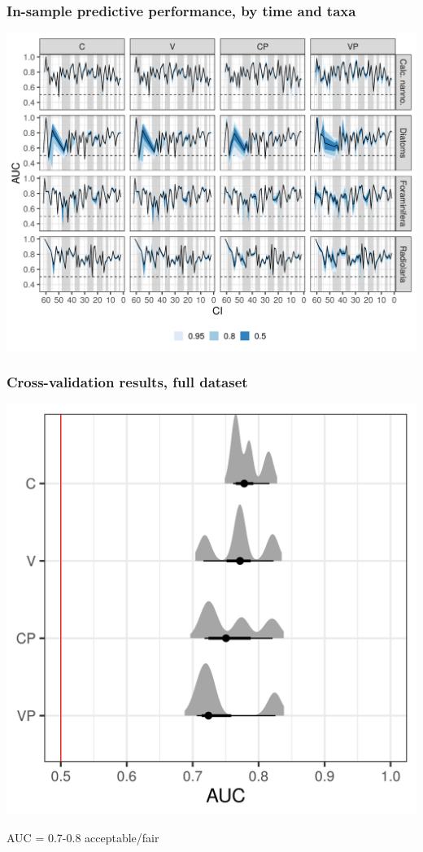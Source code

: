 \documentclass[aspectratio=169]{beamer}
\begin{document}
\begin{frame}
  \frametitle{In-sample predictive performance, by time and taxa}

  \begin{center}
    \includegraphics[width=\textwidth,height=0.8\textheight,keepaspectratio=true]{../results/figure/auc_taxon_time_full}
  \end{center}

\end{frame}

\begin{frame}
  \frametitle{Cross-validation results, full dataset}

  \begin{center}
    \includegraphics[width=\textwidth,height=0.8\textheight,keepaspectratio=true]{../results/figure/fold_auc_zoom_full}

    \footnotesize{AUC = 0.7-0.8 acceptable/fair}
  \end{center}

\end{frame}
\end{document}
